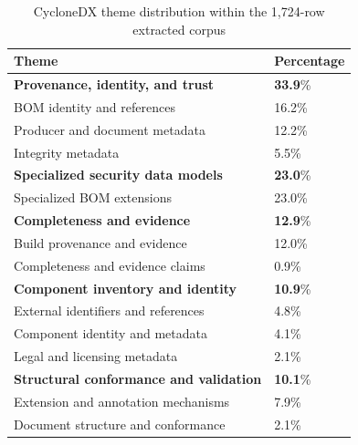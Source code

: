 \begin{table}[t]
\caption{CycloneDX theme distribution within the 1,724-row extracted corpus}
\label{tab:cdx_theme_distribution}
\centering
\footnotesize
\begin{tabular}{@{}ll@{}}
\toprule
\textbf{Theme} & \textbf{Percentage} \\
\midrule

\textbf{Provenance, identity, and trust} & \textbf{33.9}\% \\
\hspace{1.5em}BOM identity and references & 16.2\% \\
\hspace{1.5em}Producer and document metadata & 12.2\% \\
\hspace{1.5em}Integrity metadata & 5.5\% \\

\textbf{Specialized security data models} & \textbf{23.0}\% \\
\hspace{1.5em}Specialized BOM extensions & 23.0\% \\

\textbf{Completeness and evidence} & \textbf{12.9}\% \\
\hspace{1.5em}Build provenance and evidence & 12.0\% \\
\hspace{1.5em}Completeness and evidence claims & 0.9\% \\

\textbf{Component inventory and identity} & \textbf{10.9}\% \\
\hspace{1.5em}External identifiers and references & 4.8\% \\
\hspace{1.5em}Component identity and metadata & 4.1\% \\
\hspace{1.5em}Legal and licensing metadata & 2.1\% \\

\textbf{Structural conformance and validation} & \textbf{10.1}\% \\
\hspace{1.5em}Extension and annotation mechanisms & 7.9\% \\
\hspace{1.5em}Document structure and conformance & 2.1\% \\


\end{tabular}
\end{table}
